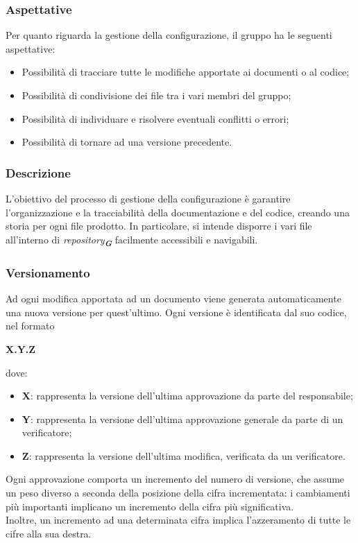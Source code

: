 \subsubsection{Aspettative}
Per quanto riguarda la gestione della configurazione, il gruppo ha le seguenti aspettative:
\begin{itemize}
    \item Possibilità di tracciare tutte le modifiche apportate ai documenti o al codice;
    \item Possibilità di condivisione dei file tra i vari membri del gruppo;
    \item Possibilità di individuare e risolvere eventuali conflitti o errori;
    \item Possibilità di tornare ad una versione precedente.
\end{itemize}

\subsubsection{Descrizione}
L’obiettivo del processo di gestione della configurazione è garantire l’organizzazione e la
tracciabilità della documentazione e del codice, creando una storia per ogni file prodotto.
In particolare, si intende disporre i vari file all’interno di \emph{repository}\textsubscript{\textit{\textbf{G}}} 
facilmente accessibili e navigabili.


\subsubsection{Versionamento}

Ad ogni modifica apportata ad un documento viene generata automaticamente una nuova
versione per quest’ultimo. Ogni versione è identificata dal suo codice, nel formato
\begin{center}
    \textbf{X.Y.Z}
\end{center}
dove:
\begin{itemize}
    \item \textbf{X}: rappresenta la versione dell’ultima approvazione da parte del responsabile;
    \item \textbf{Y}: rappresenta la versione dell’ultima approvazione generale da parte di un verificatore;
    \item \textbf{Z}: rappresenta la versione dell’ultima modifica, verificata da un verificatore.
\end{itemize}
Ogni approvazione comporta un incremento del numero di versione, che assume un peso
diverso a seconda della posizione della cifra incrementata: i cambiamenti più importanti
implicano un incremento della cifra più significativa.\\
Inoltre, un incremento ad una determinata cifra implica l’azzeramento di tutte le cifre alla
sua destra.

